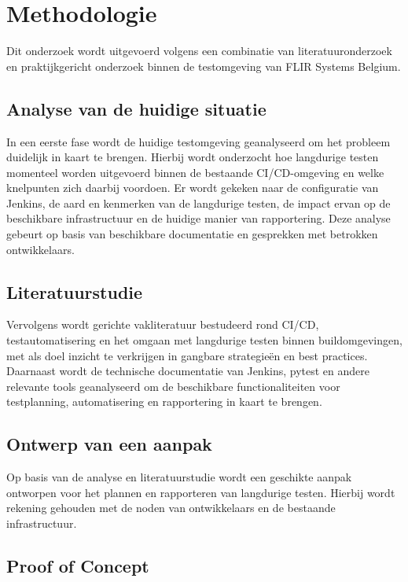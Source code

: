 
\section{Methodologie}
\label{sec:methodologie}
Dit onderzoek wordt uitgevoerd volgens een combinatie van literatuuronderzoek en praktijkgericht onderzoek binnen de testomgeving van FLIR Systems Belgium.

\subsection{Analyse van de huidige situatie}

In een eerste fase wordt de huidige testomgeving geanalyseerd om het probleem duidelijk in kaart te brengen. Hierbij wordt onderzocht hoe langdurige testen momenteel worden uitgevoerd binnen de bestaande CI/CD-omgeving en welke knelpunten zich daarbij voordoen. Er wordt gekeken naar de configuratie van Jenkins, de aard en kenmerken van de langdurige testen, de impact ervan op de beschikbare infrastructuur en de huidige manier van rapportering. Deze analyse gebeurt op basis van beschikbare documentatie en gesprekken met betrokken ontwikkelaars.

\subsection{Literatuurstudie}

Vervolgens wordt gerichte vakliteratuur bestudeerd rond CI/CD, testautomatisering en het omgaan met langdurige testen binnen buildomgevingen, met als doel inzicht te verkrijgen in gangbare strategieën en best practices. Daarnaast wordt de technische documentatie van Jenkins, pytest en andere relevante tools geanalyseerd om de beschikbare functionaliteiten voor testplanning, automatisering en rapportering in kaart te brengen.

\subsection{Ontwerp van een aanpak}

Op basis van de analyse en literatuurstudie wordt een geschikte aanpak ontworpen voor het plannen en rapporteren van langdurige testen. Hierbij wordt rekening gehouden met de noden van ontwikkelaars en de bestaande infrastructuur.

\subsection{Proof of Concept}

